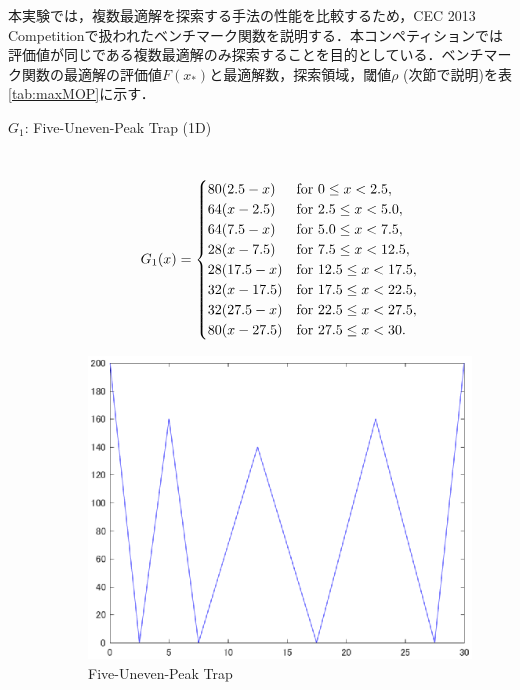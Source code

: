 \documentclass[a4j,11pt]{jarticle}
\begin{document}
\label{ss:maxFunc}
本実験では，複数最適解を探索する手法の性能を比較するため，CEC 2013 Competitionで扱われたベンチマーク関数を説明する．本コンペティションでは評価値が同じである複数最適解のみ探索することを目的としている．ベンチマーク関数の最適解の評価値$F(x_*)$と最適解数，探索領域，閾値$\rho$ (次節で説明)を表\ref{tab:maxMOP}に示す．
\begin{description}
\item[$G_1$: Five-Uneven-Peak Trap (1D)]\mbox{}\\
\begin{equation}
\label{eq:maxF1}
G_1(x)=\begin{cases}
80(2.5-x) & {\rm for} \ 0 \leq x < 2.5, \\
64(x-2.5) & {\rm for} \ 2.5 \leq x < 5.0, \\
64(7.5-x) & {\rm for} \ 5.0 \leq x < 7.5, \\
28(x-7.5) & {\rm for} \ 7.5 \leq x < 12.5, \\
28(17.5-x) & {\rm for} \ 12.5 \leq x < 17.5, \\
32(x-17.5) & {\rm for} \ 17.5 \leq x < 22.5, \\
32(27.5-x) & {\rm for} \ 22.5 \leq x < 27.5, \\
80(x-27.5) & {\rm for} \ 27.5 \leq x < 30.
\end{cases}
\end{equation}
\begin{figure}[h]
\centering
\includegraphics[width=0.8\linewidth]{eps/F1.eps}
\caption{Five-Uneven-Peak Trap}
\label{fig:maxF1}
\end{figure}


\end{description}
\end{document}
